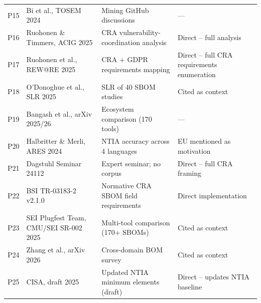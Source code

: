 \begin{table}[t]
\begin{tabular}{p{}p{}p{}p{}}
P15 & Bi et al., TOSEM 2024 \cite{bi2024} & Mining GitHub discussions & --- \\
P16 & Ruohonen \& Timmers, ACIG 2025 \cite{ruohonen2025timmers} & CRA vulnerability-coordination analysis & Direct -- full analysis \\
P17 & Ruohonen et al., REW@RE 2025 \cite{ruohonen2025gdpr} & CRA + GDPR requirements mapping & Direct -- full CRA requirements enumeration \\
P18 & O'Donoghue et al., SLR 2025 \cite{odonoghue2025slr} & SLR of 40 SBOM studies & Cited as context \\
P19 & Bangash et al., arXiv 2025/26 \cite{bangash2026} & Ecosystem comparison (170 tools) & --- \\
P20 & Halbritter \& Merli, ARES 2024 \cite{halbritter2024} & NTIA accuracy across 4 languages & EU mentioned as motivation \\
P21 & Dagstuhl Seminar 24112 \cite{dagstuhl2024} & Expert seminar; no corpus & Direct -- full CRA framing \\
P22 & BSI TR-03183-2 v2.1.0 \cite{bsi2025} & Normative CRA SBOM field requirements & Direct implementation \\
P23 & SEI Plugfest Team, CMU/SEI SR-002 2025 \cite{seiplugfest2025} & Multi-tool comparison (170+ SBOMs) & Cited as context \\
P24 & Zhang et al., arXiv 2026 \cite{zhang2026} & Cross-domain BOM survey & Cited as context \\
P25 & CISA, draft 2025 \cite{cisa2025} & Updated NTIA minimum elements (draft) & Direct -- updates NTIA baseline \\
\bottomrule
\end{tabular}
\end{table}
